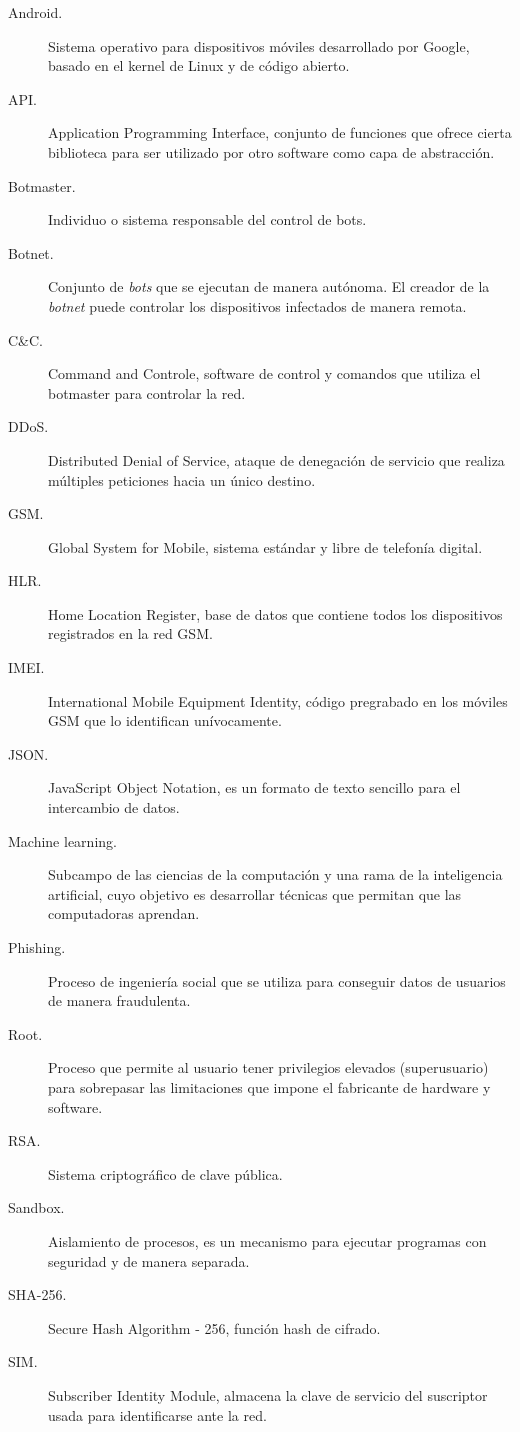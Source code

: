 \documentclass[a4paper,11pt]{report}
\begin{document}
\begin{description}
\item[Android.] Sistema operativo para dispositivos móviles desarrollado por Google, basado en el kernel de Linux y de código abierto.
\item[API.] Application Programming Interface, conjunto de funciones que ofrece cierta biblioteca para ser utilizado por otro software como capa de abstracción.
\item[Botmaster.]  Individuo o sistema responsable del control de bots.
\item[Botnet.] Conjunto de \emph{bots} que se ejecutan de manera autónoma. El creador de la \emph{botnet} puede controlar los dispositivos infectados de manera remota.
\item[C\&{}C.] Command and Controle, software de control y comandos que utiliza el botmaster para controlar la red.
\item[DDoS.] Distributed Denial of Service, ataque de denegación de servicio que realiza múltiples peticiones hacia un único destino.
\item[GSM.] Global System for Mobile, sistema estándar y libre de telefonía digital.
\item[HLR.] Home Location Register, base de datos que contiene todos los dispositivos registrados en la red GSM.
\item[IMEI.] International Mobile Equipment Identity, código pregrabado en los móviles GSM que lo identifican unívocamente.
\item[JSON.] JavaScript Object Notation, es un formato de texto sencillo para el intercambio de datos. 
\item[Machine learning.] Subcampo de las ciencias de la computación y una rama de la inteligencia artificial, cuyo objetivo es desarrollar técnicas que permitan que las computadoras aprendan. 
\item[Phishing.] Proceso de ingeniería social que se utiliza para conseguir datos de usuarios de manera fraudulenta.
\item[Root.] Proceso que permite al usuario tener privilegios elevados (superusuario) para sobrepasar las limitaciones que impone el fabricante de hardware y software.
\item[RSA.] Sistema criptográfico de clave pública.
\item[Sandbox.] Aislamiento de procesos, es un mecanismo para ejecutar programas con seguridad y de manera separada.
\item[SHA-256.] Secure Hash Algorithm - 256, función hash de cifrado.
\item[SIM.] Subscriber Identity Module, almacena la clave de servicio del suscriptor usada para identificarse ante la red.
\end{description}
\end{document}
